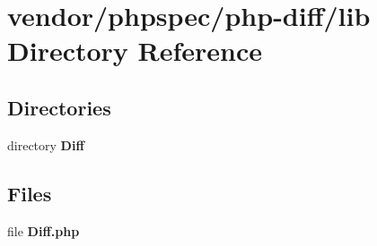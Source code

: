 \section{vendor/phpspec/php-\/diff/lib Directory Reference}
\label{dir_489d89c0b22adc09a28c9998aeb338c1}
\subsection*{Directories}
\begin{DoxyCompactItemize}
\item 
directory {\bf Diff}
\end{DoxyCompactItemize}
\subsection*{Files}
\begin{DoxyCompactItemize}
\item 
file {\bf Diff.\+php}
\end{DoxyCompactItemize}
